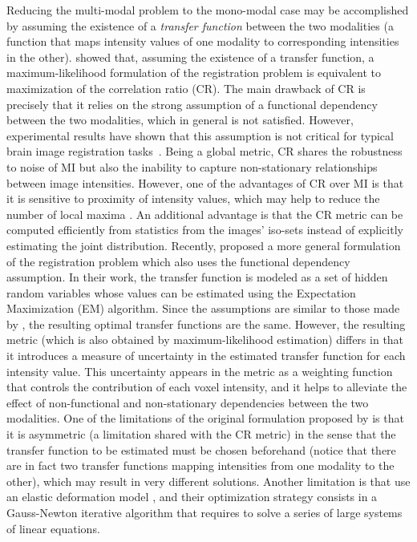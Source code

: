 Reducing the multi-modal problem to the mono-modal case may be accomplished by assuming the existence of a {\it transfer function} between the two modalities (a function that maps intensity values of one modality to corresponding intensities in the other). \cite{Roche2000} showed that, assuming the existence of a transfer function, a maximum-likelihood formulation of the registration problem is equivalent to maximization of the correlation ratio (CR). The main drawback of CR is precisely that it relies on the strong assumption of a functional dependency between the two modalities, which in general is not satisfied. However, experimental results have shown that this assumption is not critical for typical brain image registration tasks~\citep{Roche1998}. Being a global metric, CR shares the robustness to noise of MI but also the inability to capture non-stationary relationships between image intensities. However, one of the advantages of CR over MI is that it is sensitive to proximity of intensity values, which may help to reduce the number of local maxima \citep{Roche1998}. An additional advantage is that the CR metric can be computed efficiently from statistics from the images' iso-sets instead of explicitly estimating the joint distribution. Recently, \cite{Arce-santana2014} proposed a more general formulation of the registration problem which also uses the functional dependency assumption. In their work, the transfer function is modeled as a set of hidden random variables whose values can be estimated using the Expectation Maximization (EM) algorithm. Since the assumptions are similar to those made by \cite{Roche1998, Roche2000}, the resulting optimal transfer functions are the same. However, the resulting metric (which is also obtained by maximum-likelihood estimation) differs in that it introduces a measure of uncertainty in the estimated transfer function for each intensity value. This uncertainty appears in the metric as a weighting function that controls the contribution of each voxel intensity, and it helps to alleviate the effect of non-functional and non-stationary dependencies between the two modalities. One of the limitations of the original formulation proposed by \cite{Arce-santana2014} is that it is asymmetric (a limitation shared with the CR metric) in the sense that the transfer function to be estimated must be chosen beforehand (notice that there are in fact two transfer functions mapping intensities from one modality to the other), which may result in very different solutions. Another limitation is that \cite{Arce-santana2014} use an elastic deformation model \citep{Bajcsy1982, Gee1999}, and their optimization strategy consists in a Gauss-Newton iterative algorithm \citep{GVK502988711} that requires to solve a series of large systems of linear equations.\\

